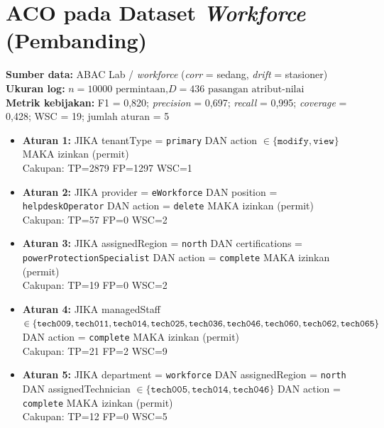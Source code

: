 \section{ACO pada Dataset \textit{Workforce} (Pembanding)}

\textbf{Sumber data:} ABAC Lab / \textit{workforce} (\textit{corr} = sedang, \textit{drift} = stasioner) \\
\textbf{Ukuran log:} $n = 10000 \text{ permintaan,} D = 436 \text{ pasangan atribut-nilai}$ \\
\textbf{Metrik kebijakan:} F1 = 0,820; \textit{precision} = 0,697; \textit{recall} = 0,995; \textit{coverage} = 0,428; WSC = 19; jumlah aturan = 5 \\

\begin{itemize}
    \item \textbf{Aturan 1:} JIKA \textsf{tenantType} = \texttt{primary} DAN \textsf{action} $\in \{\texttt{modify}, \texttt{view}\}$ MAKA izinkan (permit) \\
    \hspace*{1cm} Cakupan: TP=2879  FP=1297  WSC=1

    \item \textbf{Aturan 2:} JIKA \textsf{provider} = \texttt{eWorkforce} DAN \textsf{position} = \\\texttt{helpdeskOperator} DAN \textsf{action} = \texttt{delete} MAKA izinkan (permit) \\
    \hspace*{1cm} Cakupan: TP=57  FP=0  WSC=2

    \item \textbf{Aturan 3:} JIKA \textsf{assignedRegion} = \texttt{north} DAN \textsf{certifications} = \texttt{powerProtectionSpecialist} DAN \textsf{action} = \texttt{complete} MAKA izinkan (permit) \\
    \hspace*{1cm} Cakupan: TP=19  FP=0  WSC=2

    \item \textbf{Aturan 4:} JIKA \textsf{managedStaff} $\in \{\texttt{tech009}, \texttt{tech011}, \texttt{tech014}, \\\texttt{tech025}, \texttt{tech036}, \texttt{tech046}, \texttt{tech060}, \texttt{tech062}, \texttt{tech065}\}$ DAN \textsf{action} = \texttt{complete} MAKA izinkan (permit) \\
    \hspace*{1cm} Cakupan: TP=21  FP=2  WSC=9

    \item \textbf{Aturan 5:} JIKA \textsf{department} = \texttt{workforce} DAN \textsf{assignedRegion} = \texttt{north} DAN \textsf{assignedTechnician} $\in \{\texttt{tech005}, \texttt{tech014}, \texttt{tech046}\}$ DAN \textsf{action} = \texttt{complete} MAKA izinkan (permit) \\
    \hspace*{1cm} Cakupan: TP=12  FP=0  WSC=5

\end{itemize}